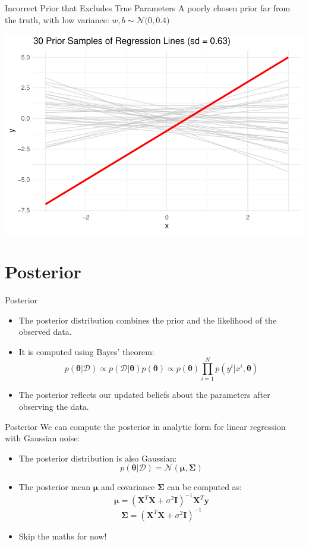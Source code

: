 \documentclass{beamer}
\begin{document}
\begin{frame}{Incorrect Prior that Excludes True Parameters}
  A poorly chosen prior far from the truth, with low variance:
  \(
    w, b \sim \mathcal{N}\big(0, 0.4\big)
  \)

  \begin{center}
    \includegraphics[width=0.8\linewidth]{prior_2_3.pdf}
  \end{center}
\end{frame}

\section{Posterior}

\begin{frame}{Posterior}
  \begin{itemize}
  \item The posterior distribution combines the prior and the likelihood of the observed data.
  \item It is computed using Bayes' theorem:
    \[
      p(\bm{\theta} | \mathcal{D}) \propto p(\mathcal{D} | \bm{\theta}) p(\bm{\theta})
                                   \propto p(\bm{\theta}) \prod_{i=1}^{N} p(y^i | x^i, \bm{\theta})
  \]

  \item The posterior reflects our updated beliefs about the parameters after observing the data.
  \end{itemize}
\end{frame}

\begin{frame}{Posterior}
  We can compute the posterior in analytic form for linear regression with Gaussian noise:
  \begin{itemize}
  \item The posterior distribution is also Gaussian:
    \[
      p(\bm{\theta} | \mathcal{D}) = \mathcal{N}(\bm{\mu}, \bm{\Sigma})
    \]
  \item The posterior mean \(\bm{\mu}\) and covariance \(\bm{\Sigma}\) can be computed as:
    \[
      \bm{\mu} = (\bm{X}^T \bm{X} + \sigma^2 \bm{I})^{-1} \bm{X}^T \bm{y}
    \]
    \[
      \bm{\Sigma} = (\bm{X}^T \bm{X} + \sigma^2 \bm{I})^{-1}
    \]
  \item Skip the maths for now!
  \end{itemize}

\end{frame}
\end{document}
